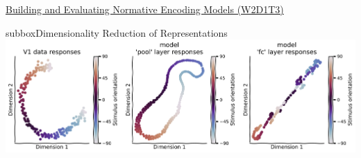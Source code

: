 \begin{textbox}{\href{https://compneuro.neuromatch.io/tutorials/W2D1_DeepLearning/student/W2D1_Tutorial3.html}{Building and Evaluating Normative Encoding Models (W2D1T3)} }
\begin{subbox}{subbox}{Dimensionality Reduction of Representations}
\centering
\includegraphics[scale=0.18]{Figures/DL/DLFigure7.png}

\end{subbox}
\end{textbox}